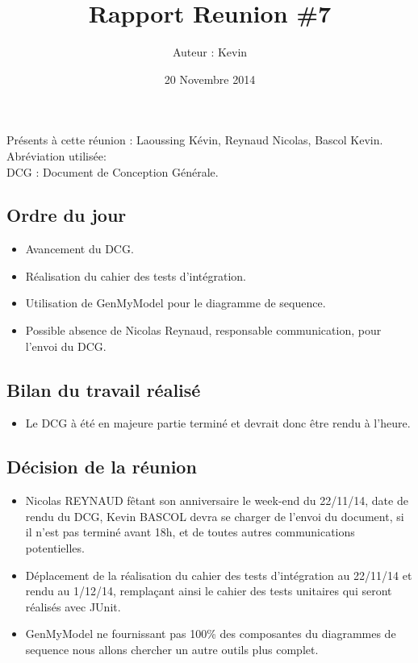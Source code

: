 \documentclass[12pt,a4paper]{article}
\title{Rapport Reunion \#7}
\author{Auteur : Kevin \bsc{BASCOL}}
\date{20 Novembre 2014}
\begin{document}
\maketitle

\newpage

Présents à cette réunion : Laoussing Kévin, Reynaud Nicolas, Bascol Kevin.\\

Abréviation utilisée:\\
DCG : Document de Conception Générale.

\subsection*{Ordre du jour}
\begin{itemize}[label = $\ast$]
\item Avancement du DCG.
\item Réalisation du cahier des tests d'intégration.
\item Utilisation de GenMyModel pour le diagramme de sequence.
\item Possible absence de Nicolas Reynaud, responsable communication, pour l'envoi du DCG.
\end{itemize}

\subsection*{Bilan du travail réalisé}

\begin{itemize}[label = $\ast$]
\item Le DCG à été en majeure partie terminé et devrait donc être rendu à l'heure.
\end{itemize}


\subsection*{Décision de la réunion}

\begin{itemize}[label = $\ast$]
\item Nicolas REYNAUD fêtant son anniversaire le week-end du 22/11/14, date de rendu du DCG, Kevin BASCOL devra se charger de l'envoi du document, si il n'est pas terminé avant 18h, et de toutes autres communications potentielles.
\item Déplacement de la réalisation du cahier des tests d'intégration au 22/11/14 et rendu au 1/12/14, remplaçant ainsi le cahier des tests unitaires qui seront réalisés avec JUnit.
\item GenMyModel ne fournissant pas 100\% des composantes du diagrammes de sequence nous allons chercher un autre outils plus complet.
\end{itemize}
\end{document}
